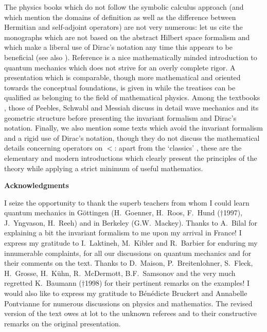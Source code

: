 \documentclass[12pt]{report}
\begin{document}
The physics books which do not follow the symbolic calculus approach 
(and which mention the domains of definition as well as the difference 
between Hermitian and self-adjoint operators) are not very numerous:
let us cite the monographs \cite{gap} 
which are not based on the abstract Hilbert space  
formalism and which make a
liberal use of Dirac's notation any time this 
appears to be beneficial
(see also \cite{bal, sche}). 
Reference \cite{mue} is a 
nice mathematically minded introduction 
to quantum mechanics which  does not 
strive for an overly complete  rigor.
A presentation  which is comparable, though more mathematical 
and oriented towards the conceptual foundations, is given in 
\cite{jmj} while the treatises
\cite{ber,th,rj,gl}
can be qualified as belonging to the field of mathematical physics. 
Among the textbooks \cite{ct}, those of Peebles, Schwabl and
Messiah  discuss 
in detail wave mechanics and its geometric structure before presenting 
the invariant formalism and Dirac's notation. 
Finally, we also mention some texts which avoid the 
invariant formalism and a rigid use of Dirac's notation, 
though they do not discuss the mathematical details concerning 
operators on 
$\lt$: apart from the `classics' \cite{ll}, these are the elementary and
modern introductions \cite{pd} which clearly present the principles of the
theory while applying a strict minimum of useful mathematics. 


 
 
 
\vspace{14mm}
 
{\bf \Large Acknowledgments}
 
\vspace{5mm}
 
I seize the opportunity to thank the superb teachers from whom 
I could learn quantum mechanics in
G\"ottingen (H.~Goenner, H.~Roos, F.~Hund ($\dagger$1997),
J.~Yngvason, H.~Reeh) and in Berkeley (G.W.~Mackey).
Thanks to A.~Bilal for explaining a bit the invariant formalism 
to me upon my arrival in France! 
I express my gratitude to I.~Laktineh, M.~Kibler
and R.~Barbier for enduring my innumerable complaints, 
for all our discussions on quantum mechanics and for their 
comments on the text. 
Thanks to D.~Maison, P.~Breitenlohner, S.~Fleck, 
H.~Grosse, H.~K\"uhn,
R.~McDermott, B.F.~Samsonov and the very much 
regretted K.~Baumann ($\dagger$1998) 
for their pertinent remarks on the examples!
I would also like to express my gratitude to 
B\'en\'edicte Bruckert and Annabelle
Pontvianne for numerous discussions on physics and 
mathematics. The revised version of the text 
owes at lot to the unknown referees and to their 
constructive remarks on the original presentation.  
\end{document}
